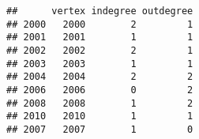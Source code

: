 \documentclass[
]{article}
\begin{document}
\begin{verbatim}
##      vertex indegree outdegree
## 2000   2000        2         1
## 2001   2001        1         1
## 2002   2002        2         1
## 2003   2003        1         1
## 2004   2004        2         2
## 2006   2006        0         2
## 2008   2008        1         2
## 2010   2010        1         1
## 2007   2007        1         0
\end{verbatim}
\end{document}
